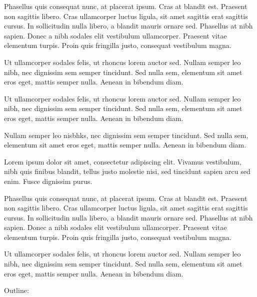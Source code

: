 Phasellus quis consequat nunc, at placerat ipsum. Cras at blandit est. Praesent non sagittis libero. Cras ullamcorper luctus ligula, sit amet sagittis erat sagittis cursus. In sollicitudin nulla libero, a blandit mauris ornare sed. Phasellus at nibh sapien. Donec a nibh sodales elit vestibulum ullamcorper. Praesent vitae elementum turpis. Proin quis fringilla justo, consequat vestibulum magna. 

Ut ullamcorper sodales felis, ut rhoncus lorem auctor sed. Nullam semper leo nibh, nec dignissim sem semper tincidunt. Sed nulla sem, elementum sit amet eros eget, mattis semper nulla. Aenean in bibendum diam.

Ut ullamcorper sodales felis, ut rhoncus lorem auctor sed. Nullam semper leo nibh, nec dignissim sem semper tincidunt. Sed nulla sem, elementum sit amet eros eget, mattis semper nulla. Aenean in bibendum diam.

Nullam semper leo nisbhks, nec dignissim sem semper tincidunt. Sed nulla sem, elementum sit amet eros eget, mattis semper nulla. Aenean in bibendum diam.

Lorem ipsum dolor sit amet, consectetur adipiscing elit. Vivamus vestibulum, nibh quis finibus blandit, tellus justo molestie nisi, sed tincidunt sapien arcu sed enim. Fusce dignissim purus. 

Phasellus quis consequat nunc, at placerat ipsum. Cras at blandit est. Praesent non sagittis libero. Cras ullamcorper luctus ligula, sit amet sagittis erat sagittis cursus. In sollicitudin nulla libero, a blandit mauris ornare sed. Phasellus at nibh sapien. Donec a nibh sodales elit vestibulum ullamcorper. Praesent vitae elementum turpis. Proin quis fringilla justo, consequat vestibulum magna. 

Ut ullamcorper sodales felis, ut rhoncus lorem auctor sed. Nullam semper leo nibh, nec dignissim sem semper tincidunt. Sed nulla sem, elementum sit amet eros eget, mattis semper nulla. Aenean in bibendum diam.

\vfil\break


Outline:


